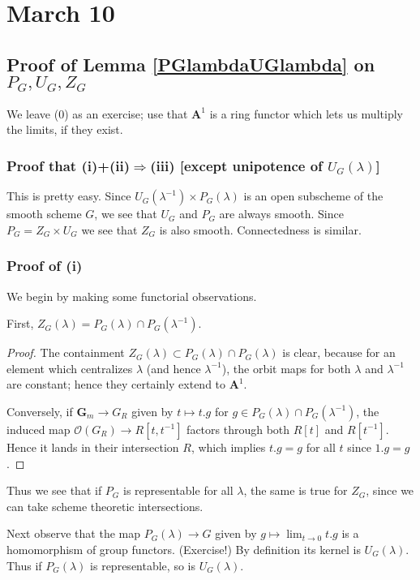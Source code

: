 \documentclass[10pt]{article}
\renewcommand{\(}{\left(}
\renewcommand{\)}{\right)}
\numberwithin{thm}{subsection}
\begin{document}
\section{March 10}
\subsection{Proof of Lemma \ref{PGlambdaUGlambda} on $P_G,U_G,Z_G$}
We leave (0) as an exercise; use that $\mathbf{A}^1$ is a ring functor
which lets us multiply the limits, if they exist.

\subsubsection{Proof that (i)+(ii)\ensuremath{\Rightarrow}(iii) [except unipotence of $U_G(\lambda)$]}
This is pretty easy.
Since $U_G(\lambda^{-1})\times P_G(\lambda)$ is an open subscheme of the smooth scheme $G$, we see that $U_G$ and $P_G$ are always smooth.
Since $P_G=Z_G\times U_G$ we see that $Z_G$ is also smooth.
Connectedness is similar.

\subsubsection{Proof of (i)}
We begin by making some functorial observations.

First, $Z_G(\lambda)=P_G(\lambda)\cap P_G(\lambda^{-1})$.
\begin{proof}
The containment $Z_G(\lambda)\subset P_G(\lambda)\cap P_G(\lambda)$ is clear,
because for an element which centralizes $\lambda$ (and hence $\lambda^{-1}$),
the orbit maps for both $\lambda$ and $\lambda^{-1}$ are constant;
hence they certainly extend to $\mathbf{A}^1$.

Conversely, if $\mathbf{G}_m\rightarrow G_R$ given by $t\mapsto t.g$
for $g\in P_G(\lambda)\cap P_G(\lambda^{-1})$, the induced map
$\mathcal{O}(G_R)\rightarrow R[t,t^{-1}]$ factors through both $R[t]$
and $R[t^{-1}]$.
Hence it lands in their intersection $R$, which implies $t.g=g$ for all $t$
since $1.g=g$.
\end{proof}

Thus we see that if $P_G$ is representable for all $\lambda$,
the same is true for $Z_G$, since we can take scheme theoretic intersections.

Next observe that the map $P_G(\lambda) \rightarrow G$
given by $g\mapsto \lim_{t\rightarrow0} t.g$ is a homomorphism
of group functors. (Exercise!)
By definition its kernel is $U_G(\lambda)$.
Thus if $P_G(\lambda)$ is representable, so is $U_G(\lambda)$.
\end{document}
